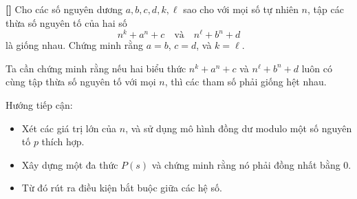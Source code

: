 \documentclass[../05-modular-arithmetic-a.tex]{subfiles}
\begin{document}
\begin{example*}\label{example:IRN-2015-MO-N4}\textbf{[]}
	Cho các số nguyên dương \( a, b, c, d, k, \ell \) sao cho với mọi số tự nhiên \( n \), tập các thừa số nguyên tố của hai số
	\[
		n^k + a^n + c \quad \text{và} \quad n^\ell + b^n + d
	\]
	là giống nhau. Chứng minh rằng \( a = b \), \( c = d \), và \( k = \ell \).
\end{example*}

\begin{story*}
    Ta cần chứng minh rằng nếu hai biểu thức \( n^k + a^n + c \) và \( n^\ell + b^n + d \) luôn có cùng tập thừa số nguyên tố với mọi \( n \), thì các tham số phải giống hệt nhau.

    Hướng tiếp cận:
    \begin{itemize}[topsep=0pt, partopsep=0pt, itemsep=0pt]
        \item Xét các giá trị lớn của \( n \), và sử dụng mô hình đồng dư modulo một số nguyên tố \( p \) thích hợp.
        \item Xây dựng một đa thức \( P(s) \) và chứng minh rằng nó phải đồng nhất bằng 0.
        \item Từ đó rút ra điều kiện bắt buộc giữa các hệ số.
    \end{itemize}
\end{story*}
\end{document}
